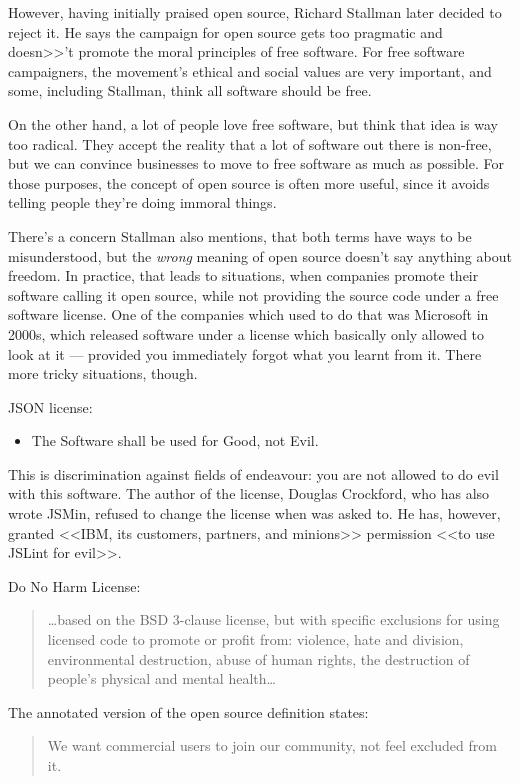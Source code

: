 \documentclass[10pt, a5paper]{article}
\begin{document}
However, having initially praised open source, Richard Stallman later decided to reject it. He says the campaign for open source gets too pragmatic and doesn>>'t promote the moral principles of free software. For free software campaigners, the movement's ethical and social values are very important, and some, including Stallman, think all software should be free.

On the other hand, a lot of people love free software, but think that idea is way too radical. They accept the reality that a lot of software out there is non-free, but we can convince businesses to move to free software as much as possible. For those purposes, the concept of open source is often more useful, since it avoids telling people they're doing immoral things.

There's a concern Stallman also mentions, that both terms have ways to be misunderstood, but the \emph{wrong} meaning of open source doesn't say anything about freedom. In practice, that leads to situations, when companies promote their software calling it open source, while not providing the source code under a free software license. One of the companies which used to do that was Microsoft in 2000s, which released software under a license which basically only allowed to look at it  ---  provided you immediately forgot what you learnt from it. There more tricky situations, though.

JSON license:

\begin{itemize}
  \item The Software shall be used for Good, not Evil.
\end{itemize}

This is discrimination against fields of endeavour: you are not \linebreak allowed to do evil with this software. The author of the license, Douglas Crockford, who has also wrote JSMin, refused to change the license when was asked to. He has, however, granted <<IBM, its customers, partners, and minions>> permission <<to use JSLint for evil>>.

Do No Harm License:

\begin{quotation}
\ldots{}based on the BSD 3-clause license, but with specific exclusions for using licensed code to promote or profit from: violence, hate and division, environmental destruction, abuse of human rights, the destruction of people's physical and mental health\ldots{}

\end{quotation}

The annotated version of the open source definition states:

\begin{quotation}
We want commercial users to join our community, not feel excluded from it.

\end{quotation}
\end{document}
